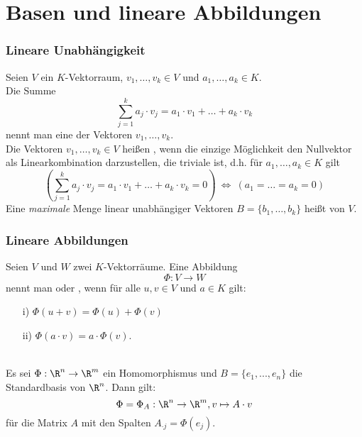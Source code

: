 \section{Basen und lineare Abbildungen}
%
\begin{frame}\frametitle{Lineare Unabhängigkeit}
	Seien $V$ ein $K$-Vektorraum, $v_1,\ldots, v_k \in V$ und $a_1,\ldots, a_k \in K$. \\[1mm]
	
	Die Summe
	$$
		\sum_{j=1}^k a_j\cdot v_j = a_1\cdot v_1 + \ldots + a_k\cdot v_k
	$$ 
	nennt man eine  der Vektoren $v_1, \ldots, v_k$.\\\vfill
	Die Vektoren $v_1,\ldots, v_k \in V$ hei{\ss}en , wenn die einzige Möglichkeit den Nullvektor als Linearkombination darzustellen, die triviale ist, d.h.
	für $a_1,\ldots, a_k\in K$  gilt
	$$
		\left(\sum_{j=1}^k a_j\cdot v_j = a_1\cdot v_1 + \ldots + a_k\cdot v_k = 0 \right) \ \Leftrightarrow \ \left( a_1=\ldots = a_k = 0 \right)
	$$
	Eine \textit{maximale} Menge linear unabhängiger Vektoren $B=\{b_1,\ldots, b_k\}$ hei{\ss}t
	 von $V$.\\
\end{frame}
%
%
\begin{frame}\frametitle{Lineare Abbildungen}
Seien $V$ und $W$ zwei $K$-Vektorräume.
	Eine Abbildung
	$$
		\Phi: V \to W
	$$ 
	nennt man  oder , 
	wenn für alle $u,v \in V$ und $a\in K$ gilt:
	\begin{itemize}
		\item[i)] $\Phi(u+v)		= \Phi(u) + \Phi(v)$
		\item[ii)] $\Phi(a\cdot v)	= a\cdot \Phi(v).$
	\end{itemize}
	\\
Es sei $\Phi:\R^n \to \R^m$ ein Homomorphismus und $B=\{e_1,...,e_n\}$ die Standardbasis von $\R^n$. Dann gilt:
$$
\Phi=\Phi_A:\R^n \to \R^m, v \mapsto A\cdot v 
$$
für die Matrix $A$ mit den Spalten $A_{\cdot j}=\Phi(e_j)$.
\end{frame}
%
%
